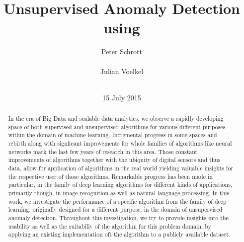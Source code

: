 \documentclass{vldb}
\begin{document}

\title{Unsupervised Anomaly Detection using }





\author{
\alignauthor
Peter Schrott\\
       \\
\alignauthor
Julian Voelkel\\
       \\
}
\date{15 July 2015}

\maketitle


\begin{abstract}
In the era of Big Data and scalable data analytics, we observe a rapidly developing space of both supervised and unsupervised algorithms for various different purposes within the domain of machine learning. Incremental progress in some spaces and rebirth along with signficant improvements for whole families of algorithms like neural networks mark the last few years of research in this area. Those constant improvements of algorithms together with the ubiquity of digital sensors and thus data, allow for application of algorithms in the real world yielding valuable insights for the respective user of those algorithms. Remarkable progress has been made in particular, in the family of deep learning algorithms for different kinds of applications, primarily though, in image recognition as well as natural language processing.
In this work, we investigate the performance of a specific algorithm from the family of deep learning, originally designed for a different purpose, in the domain of unsupervised anomaly detection. Throughout this investigation, we try to provide insights into the usability as well as the suitabiliy of the algorithm for this problem domain, by applying an existing implementation oft the algorithm to a publicly available dataset.
\end{abstract}
\end{document}
